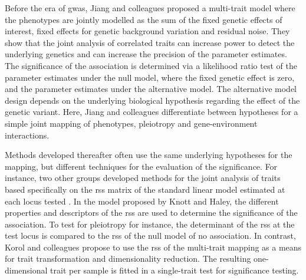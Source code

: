 Before the era of \gls{gwas}, Jiang and colleagues \parencite*{Jiang1995} proposed a multi-trait model where the phenotypes are jointly modelled as the sum of the fixed genetic effects of interest, fixed effects for genetic background variation and residual noise. They show that the joint analysis of correlated traits can increase power to detect the underlying genetics and can increase the precision of the parameter estimates. The significance of the association is determined via a likelihood ratio test of the parameter estimates under the null model, where the fixed genetic effect is zero, and the parameter estimates under the alternative model. The alternative model design depends on the underlying biological hypothesis regarding the effect of the genetic variant. Here, Jiang and colleagues differentiate between hypotheses for a simple joint mapping of phenotypes, pleiotropy and gene-environment interactions.%

Methods developed thereafter often use the same underlying hypotheses for the mapping, but different techniques for the evaluation of the significance. For instance, two other groups developed methods for the joint analysis of traits based specifically on the \gls{rss} matrix of the standard linear model estimated at each locus tested \citep{Knott2000,Korol2001}. In the model proposed by Knott and Haley, the different properties and descriptors of the \gls{rss} are used to determine the significance of the association. To test for pleiotropy for instance, the determinant of the \gls{rss} at the test locus is compared to the \gls{rss} of the null model of no association. In contrast, Korol and colleagues propose to use the \gls{rss} of the multi-trait mapping as a means for trait transformation and dimensionality reduction. The resulting one-dimensional trait per sample is fitted in a single-trait test for significance testing.  

